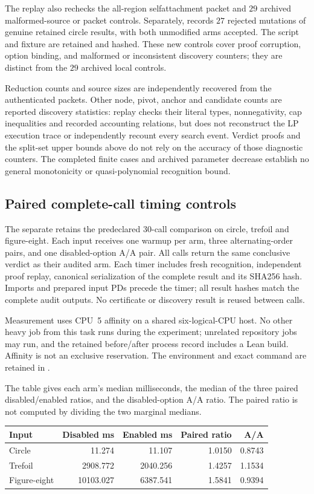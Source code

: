 The replay also rechecks the all-region selfattachment packet and $29$
archived malformed-source or packet controls.  Separately,
 records $27$
rejected mutations of genuine retained circle results, with both unmodified
arms accepted.  The script and fixture are retained and hashed.  These
new controls cover proof corruption, option binding, and malformed or
inconsistent discovery counters; they are distinct from the $29$ archived
local controls.

Reduction counts and source sizes are independently recovered from the
authenticated packets.  Other node, pivot, anchor and candidate counts
are reported discovery statistics: replay checks their literal types,
nonnegativity, cap inequalities and recorded accounting relations, but
does not reconstruct the LP execution trace or independently recount
every search event.  Verdict proofs and the split-set upper bounds above
do not rely on the accuracy of those diagnostic counters.  The completed
finite cases and archived parameter decrease establish no general
monotonicity or quasi-polynomial recognition bound.

\subsection{Paired complete-call timing controls}

The separate  retains the
predeclared $30$-call comparison on circle, trefoil and figure-eight.
Each input receives one warmup per arm, three alternating-order pairs,
and one disabled-option A/A pair.  All calls return the same conclusive
verdict as their audited arm.  Each timer includes fresh recognition,
independent proof replay, canonical serialization of the complete result
and its SHA256 hash.  Imports and prepared input PDs precede the timer;
all result hashes match the complete audit outputs.  No certificate or
discovery result is reused between calls.

Measurement uses CPU~5 affinity on a shared six-logical-CPU host.  No
other heavy job from this task runs during the experiment; unrelated
repository jobs may run, and the retained before/after process record
includes a Lean build.  Affinity is not an exclusive reservation.
The environment and exact command are retained in
.

The table gives each arm's median milliseconds, the median of the
three paired disabled/enabled ratios, and the disabled-option A/A ratio.
The paired ratio is not computed by dividing the two marginal medians.
\begin{center}\small
\begin{tabular}{lrrrr}
\toprule
Input & Disabled ms & Enabled ms & Paired ratio & A/A\\
\midrule
Circle & 11.274 & 11.107 & 1.0150 & 0.8743\\
Trefoil & 2908.772 & 2040.256 & 1.4257 & 1.1534\\
Figure-eight & 10103.027 & 6387.541 & 1.5841 & 0.9394\\
\bottomrule
\end{tabular}
\end{center}

